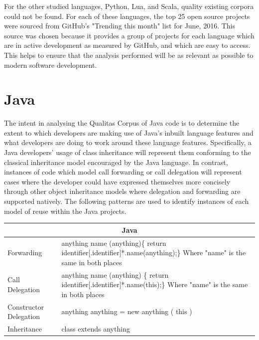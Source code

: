 For the other studied languages, Python, Lua, and Scala, quality existing corpora could not be found. For each of these languages, the top 25 open source projects were sourced from GitHub's "Trending this month" list for June, 2016. This source was chosen because it provides a group of projects for each language which are in active development as measured by GitHub, and which are easy to access. This helps to ensure that the analysis performed will be as relevant as possible to modern software development.

\section{Java}
The intent in analysing the Qualitas Corpus of Java code is to determine the extent to which developers are making use of Java's inbuilt language features and what developers are doing to work around these language features. Specifically, a Java developers' usage of class inheritance will represent them conforming to the classical inheritance model encouraged by the Java language. In contrast, instances of code which model call forwarding or call delegation will represent cases where the developer could have expressed themselves more concisely through other object inheritance models where delegation and forwarding are supported natively. The following patterns are used to identify instances of each model of reuse within the Java projects.
\newline
{}
\begin{tabular}{|p{5cm}|p{9cm}|}
	\hline
	\multicolumn{2}{|c|}{Java}                                                                                                                                               \\ \hline
	Forwarding                     & anything name (anything)\{ \newline   return identifier{[}.identifier{]}*.name(anything);\newline \} \newline Where "name" is the same in both places \\ \hline
	Call Delegation                     & anything name (anything) \{ \newline   return identifier{[}.identifier{]}*.name(this);\newline \}  \newline Where "name" is the same in both places                    \\ \hline
	Constructor Delegation & anything anything = new anything ( this )                                                                                                  \\ \hline
	Inheritance                    & class extends anything                                                                                                                                         \\ \hline
\end{tabular}\newline\newline\newline\newline
